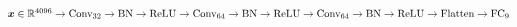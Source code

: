 $\vect{x} \in \real^{4096} \newline
	\rightarrow \text{Conv}_{32} \rightarrow \text{BN} \rightarrow \text{ReLU}  \newline
	\rightarrow \text{Conv}_{64} \rightarrow \text{BN} \rightarrow \text{ReLU}  \newline
	\rightarrow \text{Conv}_{64} \rightarrow \text{BN} \rightarrow \text{ReLU}  \newline
	\rightarrow \text{Flatten} \rightarrow \text{FC}_{9}
$